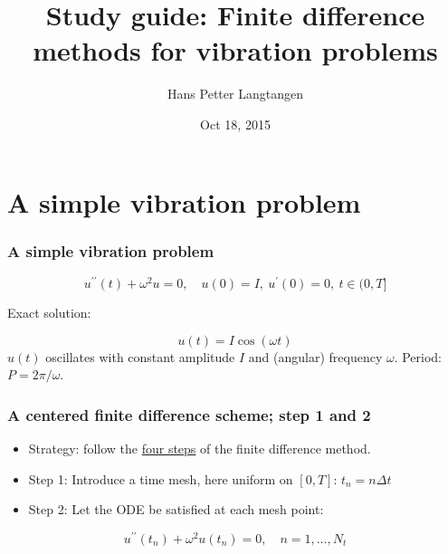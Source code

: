 \documentclass{beamer}
\begin{document}








\title{Study guide: Finite difference methods for vibration problems}


\author{Hans Petter Langtangen}

\date{Oct 18, 2015
}

\begin{frame}
\titlepage
\end{frame}

\section{A simple vibration problem}

\begin{frame}
\frametitle{A simple vibration problem}



\[
u^{\prime\prime}(t) + \omega^2u = 0,\quad u(0)=I,\ u^{\prime}(0)=0,\ t\in (0,T]
\]

Exact solution:

\[
u(t) = I\cos (\omega t)
\]
$u(t)$ oscillates with constant amplitude $I$ and
(angular) frequency $\omega$.
Period: $P=2\pi/\omega$.


\end{frame}

\begin{frame}
\frametitle{A centered finite difference scheme; step 1 and 2}

\label{vib:model1:fdm}

\begin{itemize}
 \item Strategy: follow the \href{{http://tinyurl.com/opdfafk/pub/sphinx-decay/main_decay.html#the-forward-euler-scheme}}{four steps} of the finite difference method.

 \item Step 1: Introduce a time mesh, here uniform on $[0,T]$: $t_n=n\Delta t$

 \item Step 2: Let the ODE be satisfied at each mesh point:
\end{itemize}

\noindent
\[
u^{\prime\prime}(t_n) + \omega^2u(t_n) = 0,\quad n=1,\ldots,N_t
\]
\end{frame}
\end{document}
